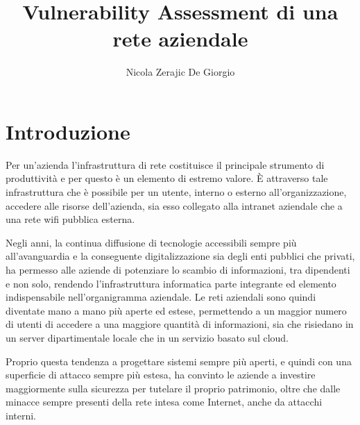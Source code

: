 \documentclass[target=bach,aauheader=]{thud}
\title{Vulnerability Assessment di una rete aziendale}
\author{Nicola Zerajic De Giorgio}
\begin{document}
\maketitle

\tableofcontents


\listoffigures

\mainmatter


\chapter{Introduzione}

Per un’azienda l’infrastruttura di rete costituisce il principale strumento di produttività e per questo è un elemento di estremo valore. È attraverso tale infrastruttura che è possibile per un utente, interno o esterno all'organizzazione, accedere alle risorse dell'azienda, sia esso collegato alla intranet aziendale che a una rete wifi pubblica esterna.

Negli anni, la continua diffusione di tecnologie accessibili sempre più all’avanguardia e la conseguente digitalizzazione sia degli enti pubblici che privati, ha permesso alle aziende di potenziare lo scambio di informazioni, tra dipendenti e non solo, rendendo l’infrastruttura informatica parte integrante ed elemento indispensabile nell’organigramma aziendale. Le reti aziendali sono quindi diventate mano a mano più aperte ed estese, permettendo a un maggior numero di utenti di accedere a una maggiore quantità di informazioni, sia che risiedano in un server dipartimentale locale che in un servizio basato sul cloud.

Proprio questa tendenza a progettare sistemi sempre più aperti, e quindi con una superficie di attacco sempre più estesa, ha convinto le aziende a investire maggiormente sulla sicurezza per tutelare il proprio patrimonio, oltre che dalle minacce sempre presenti della rete intesa come Internet, anche da attacchi interni.
\end{document}
